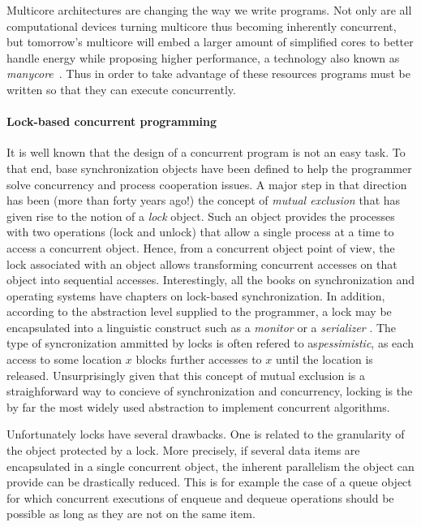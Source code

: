 







Multicore architectures are changing the way we write programs.
Not only are all computational devices
turning multicore thus becoming inherently concurrent, 
but tomorrow's multicore will embed a larger amount of simplified cores to better handle energy while 
proposing higher performance, a technology also known as \emph{manycore}~\cite{Borkar2007}.
Thus in order to take advantage of these resources programs must be written so
that they can execute concurrently.


\paragraph{Lock-based concurrent programming}
%
It is well known  that the design of a concurrent program is not an easy
task.
To that end, base synchronization objects have been defined to help 
the programmer solve  concurrency and process cooperation  issues. 
A  major step in that direction has been 
(more than forty years  ago!) the concept of {\it mutual exclusion} \cite{D68}
that has given rise  to  the  notion of  a  {\it  lock} object.    Such an
object provides the processes with two operations (lock and unlock)
that  allow a single process at a time to access a concurrent object. 
Hence, from a  concurrent object point of view,   the  lock associated with
an object allows transforming  concurrent  accesses on  that object  
into sequential accesses.  Interestingly, all the books on synchronization 
and operating systems  have chapters on lock-based
synchronization. In addition, according to the abstraction level
supplied to the programmer,  a lock may be encapsulated into a linguistic 
construct such as a {\it monitor} \cite{H74} or a {\it serializer} \cite{HA79}.
The type of syncronization ammitted by locks is often refered to as\emph{pessimistic}, 
as each access to some location $x$ blocks further accesses to $x$ until the location is released.
Unsurprisingly given that this concept of mutual exclusion is a straighforward way to
concieve of synchronization and concurrency,
locking is the by far the most widely used abstraction to
implement concurrent algorithms.

Unfortunately locks have several drawbacks. One is related to the  granularity
of the object protected by a lock. More precisely, if several data items 
are encapsulated  in a single  concurrent  object, the
inherent parallelism  the object can provide 
can be drastically reduced. This  is for example the case of a queue 
object for which concurrent executions of enqueue and dequeue operations 
should be possible as long as they are not on the same item.

